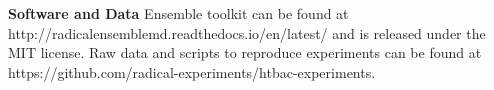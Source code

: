 
\textbf{Software and Data} Ensemble toolkit can be found at http://radicalensemblemd.readthedocs.io/en/latest/ and is released under the MIT license. Raw data and scripts to reproduce experiments can be found at https://github.com/radical-experiments/htbac-experiments.
